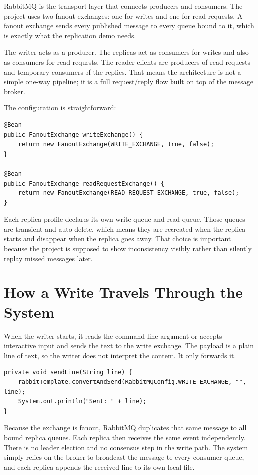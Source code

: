 \documentclass[11pt]{article}
\begin{document}
RabbitMQ is the transport layer that connects producers and consumers. The project uses two fanout exchanges: one for writes and one for read requests. A fanout exchange sends every published message to every queue bound to it, which is exactly what the replication demo needs.

The writer acts as a producer. The replicas act as consumers for writes and also as consumers for read requests. The reader clients are producers of read requests and temporary consumers of the replies. That means the architecture is not a simple one-way pipeline; it is a full request/reply flow built on top of the message broker.

The configuration is straightforward:

\begin{lstlisting}
@Bean
public FanoutExchange writeExchange() {
    return new FanoutExchange(WRITE_EXCHANGE, true, false);
}

@Bean
public FanoutExchange readRequestExchange() {
    return new FanoutExchange(READ_REQUEST_EXCHANGE, true, false);
}
\end{lstlisting}

Each replica profile declares its own write queue and read queue. Those queues are transient and auto-delete, which means they are recreated when the replica starts and disappear when the replica goes away. That choice is important because the project is supposed to show inconsistency visibly rather than silently replay missed messages later.

\section{How a Write Travels Through the System}

When the writer starts, it reads the command-line argument or accepts interactive input and sends the text to the write exchange. The payload is a plain line of text, so the writer does not interpret the content. It only forwards it.

\begin{lstlisting}
private void sendLine(String line) {
    rabbitTemplate.convertAndSend(RabbitMQConfig.WRITE_EXCHANGE, "", line);
    System.out.println("Sent: " + line);
}
\end{lstlisting}

Because the exchange is fanout, RabbitMQ duplicates that same message to all bound replica queues. Each replica then receives the same event independently. There is no leader election and no consensus step in the write path. The system simply relies on the broker to broadcast the message to every consumer queue, and each replica appends the received line to its own local file.
\end{document}
